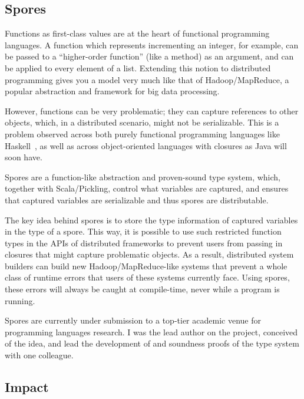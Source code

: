 \documentclass[acmtocl]{acmtrans2m}
\begin{document}
\vspace{-0.2in}
\subsection*{\textbf{Spores}}
\vspace{-0.1in}

Functions as first-class values are at the heart of functional programming
languages. A function which represents incrementing an integer, for example,
can be passed to a ``higher-order function'' (like a method) as an argument,
and can be applied to every element of a list. Extending this notion to
distributed programming gives you a model very much like that of
Hadoop/MapReduce, a popular abstraction and framework for big data processing.

However, functions can be very problematic; they can capture references to
other objects, which, in a distributed scenario, might not be serializable.
This is a problem observed across both purely functional programming languages
like Haskell~\cite{CloudHaskell}, as well as across object-oriented languages
with closures as Java will soon have.

Spores are a function-like abstraction and proven-sound type system, which,
together with Scala/Pickling, control what variables are captured, and ensures
that captured variables are serializable and thus spores are distributable.

The key idea behind spores is to store the type information of captured
variables in the type of a spore. This way, it is possible to use such restricted
function types in the APIs of distributed frameworks to prevent users from passing in
closures that might capture problematic objects.
As a result, distributed system builders can build new Hadoop/MapReduce-like systems
that prevent a whole class of runtime errors that users of these systems currently face.
Using spores, these errors will always be caught at
compile-time, never while a program is running.

Spores are currently under submission to a top-tier academic venue for
programming languages research. I was the lead author on the project,
conceived of the idea, and lead the development of and soundness proofs of
the type system with one colleague.


\vspace{-0.2in}
\subsection*{\textbf{Impact}}
\vspace{-0.1in}
\end{document}
